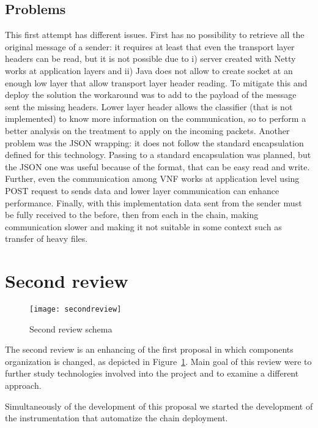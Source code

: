 \subsection{Problems}
This first attempt has different issues. First \enchainer{} has no
possibility to retrieve all the original message of a sender: it requires at
least that even the transport layer headers can be read, but it is not possible
due to i) server created with Netty works at application layers and ii) Java
does not allow to create socket at an enough low layer that allow transport
layer header reading. To mitigate this and deploy the solution the workaround
was to add to the payload of the message sent the missing headers. Lower layer
header allows the classifier (that is not implemented) to know more information
on the communication, so to perform a better analysis on the treatment to apply
on the incoming packets. Another problem was the JSON wrapping: it does not
follow the standard encapsulation defined for this technology. Passing to a
standard encapsulation was planned, but the JSON one was useful because of the
format, that can be easy read and write. Further, even the communication among
VNF works at application level using POST request to sends data and lower layer
communication can enhance performance. Finally, with this implementation data
sent from the sender must be fully received to the \enchainer{} before, then
from each \vnf{} in the chain, making communication slower and making it not
suitable in some context such as transfer of heavy files.

\section{Second review}
\begin{figure}
  \centering
  \texttt{[image: secondreview]}
  \caption{Second review schema}
  \label{chap:impl:img:secondreview}
\end{figure}
The second review is an enhancing of the first proposal in which components
organization is changed, as depicted in Figure~\ref{chap:impl:img:secondreview}.
Main goal of this review were to further study technologies involved into the
project and to examine a different approach.

Simultaneously of the development of this proposal we started the development of
the instrumentation that automatize the chain deployment.

